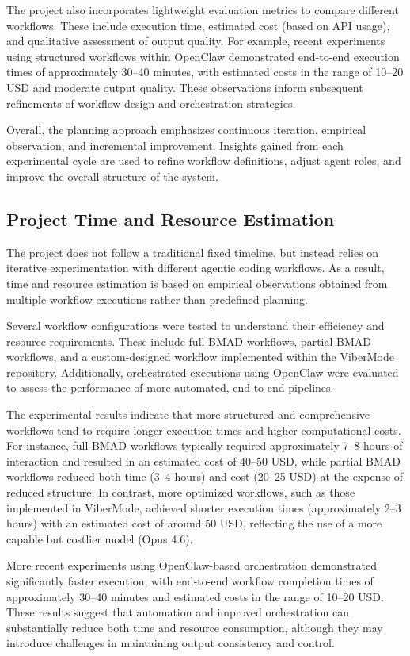 \documentclass[a4paper,12pt]{report}
\begin{document}
The project also incorporates lightweight evaluation metrics to compare different workflows. These include execution time, estimated cost (based on API usage), and qualitative assessment of output quality. For example, recent experiments using structured workflows within OpenClaw demonstrated end-to-end execution times of approximately 30--40 minutes, with estimated costs in the range of 10--20 USD and moderate output quality. These observations inform subsequent refinements of workflow design and orchestration strategies.

Overall, the planning approach emphasizes continuous iteration, empirical observation, and incremental improvement. Insights gained from each experimental cycle are used to refine workflow definitions, adjust agent roles, and improve the overall structure of the system.
\subsection{Project Time and Resource Estimation}
The project does not follow a traditional fixed timeline, but instead relies on iterative experimentation with different agentic coding workflows. As a result, time and resource estimation is based on empirical observations obtained from multiple workflow executions rather than predefined planning.

Several workflow configurations were tested to understand their efficiency and resource requirements. These include full BMAD workflows, partial BMAD workflows, and a custom-designed workflow implemented within the ViberMode repository. Additionally, orchestrated executions using OpenClaw were evaluated to assess the performance of more automated, end-to-end pipelines.

The experimental results indicate that more structured and comprehensive workflows tend to require longer execution times and higher computational costs. For instance, full BMAD workflows typically required approximately 7--8 hours of interaction and resulted in an estimated cost of 40--50 USD, while partial BMAD workflows reduced both time (3--4 hours) and cost (20--25 USD) at the expense of reduced structure. In contrast, more optimized workflows, such as those implemented in ViberMode, achieved shorter execution times (approximately 2--3 hours) with an estimated cost of around 50 USD, reflecting the use of a more capable but costlier model (Opus 4.6).

More recent experiments using OpenClaw-based orchestration demonstrated significantly faster execution, with end-to-end workflow completion times of approximately 30--40 minutes and estimated costs in the range of 10--20 USD. These results suggest that automation and improved orchestration can substantially reduce both time and resource consumption, although they may introduce challenges in maintaining output consistency and control.
\end{document}
